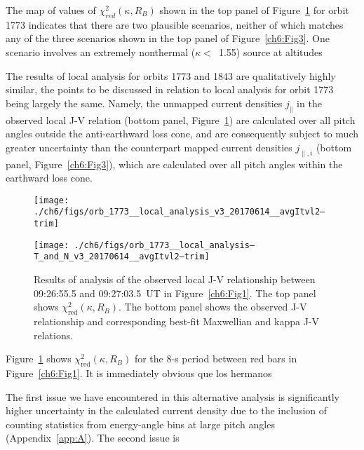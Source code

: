   The map of values of $\chi^2_{red} (\kappa, R_B)$ shown in the top panel of
  Figure~\ref{ch6:Fig7} for orbit 1773 indicates that there are two plausible
  scenarios, neither of which matches any of the three scenarios shown in the
  top panel of Figure~\ref{ch6:Fig3}. One scenario involves an extremely
  nonthermal ($\kappa <$~1.55) source at altitudes 

  The results of local analysis for orbits 1773 and 1843 are qualitatively
  highly similar, the points to be discussed in relation to local analysis for
  orbit 1773 being largely the same. Namely, the unmapped current densities
  $j_\parallel$ in the observed local J-V relation (bottom panel,
  Figure~\ref{ch6:Fig7}) are calculated over all pitch angles outside the
  anti-earthward loss cone, and are consequently subject to much greater
  uncertainty than the counterpart mapped current densities $j_{\parallel,i}$
  (bottom panel, Figure~\ref{ch6:Fig3}), which are calculated over all pitch
  angles within the earthward loss cone.


  \begin{figure}
    \centering
    \noindent\texttt{[image: ./ch6/figs/orb\_1773\_\_local\_analysis\_v3\_20170614\_\_avgItvl2--trim]}

    \vspace{1cm}

    \noindent\texttt{[image: ./ch6/figs/orb\_1773\_\_local\_analysis--T\_and\_N\_v3\_20170614\_\_avgItvl2--trim]}

    \caption[Orbit 1773: Reduced chi-squared values for local J-V relationship and
    corresponding best-fit curves.]{Results of analysis of the observed local
      J-V relationship between 09:26:55.5 and 09:27:03.5~UT in
      Figure~\ref{ch6:Fig1}. The top panel shows
      $\chi^2_{\mathrm{red}} ( \kappa, R_B)$. The bottom panel shows the
      observed J-V relationship and corresponding best-fit Maxwellian and kappa
      J-V relations.}
    \label{ch6:Fig7}
  \end{figure}

  
  Figure~\ref{ch6:Fig7} shows $\chi^2_{\mathrm{red}} ( \kappa, R_B)$ for the
  8-s period between red bars in Figure~\ref{ch6:Fig1}. It is immediately obvious que los hermanos

  The first issue we have encountered in this alternative analysis is
  significantly higher uncertainty in the calculated current density due to the
  inclusion of counting statistics from energy-angle bins at large pitch angles
  (Appendix~\ref{app:A}). The second issue is

